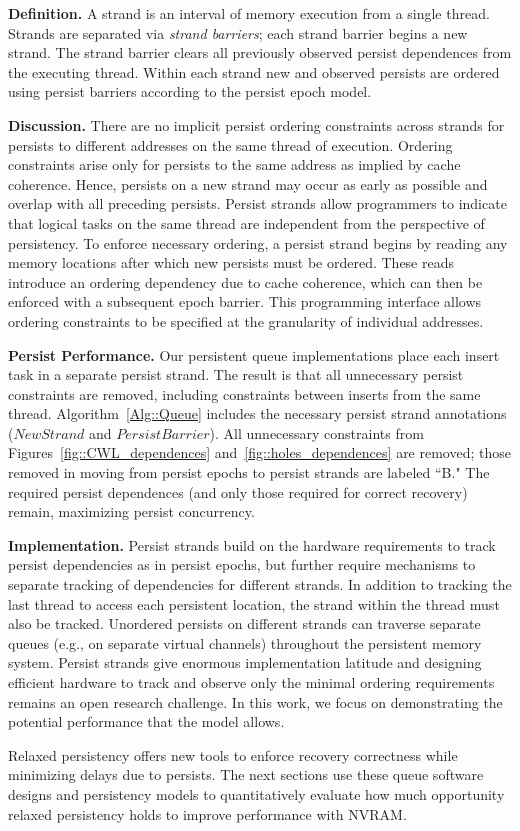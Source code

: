\textbf{Definition.}
A strand is an interval of memory execution from a single thread.
Strands are separated via \emph{strand barriers}; each strand barrier begins a new strand.
The strand barrier clears all previously observed persist dependences from the executing thread.
Within each strand new and observed persists are ordered using persist barriers according to the persist epoch model.

\textbf{Discussion.}
There are no implicit persist ordering constraints across strands for persists to different addresses on the same thread of execution.
Ordering constraints arise only for persists to the same address as implied by cache coherence.
Hence, persists on a new strand may occur as early as possible and overlap with all preceding persists.
Persist strands allow programmers to indicate that logical tasks on the same thread are independent from the perspective of persistency.
To enforce necessary ordering, a persist strand begins by reading any memory locations after which new persists must be ordered.
These reads introduce an ordering dependency due to cache coherence, which can then be enforced with a subsequent epoch barrier.
This programming interface allows ordering constraints to be specified at the granularity of individual addresses.

\textbf{Persist Performance.}
Our persistent queue implementations place each insert task in a separate persist strand.
The result is that all unnecessary persist constraints are removed, including constraints between inserts from the same thread.
Algorithm~\ref{Alg::Queue} includes the necessary persist strand annotations ($NewStrand$ and $PersistBarrier$).
All unnecessary constraints from Figures~\ref{fig::CWL_dependences} and~\ref{fig::holes_dependences} are removed; those removed in moving from persist epochs to persist strands are labeled ``B."
The required persist dependences (and only those required for correct recovery) remain, maximizing persist concurrency.

\textbf{Implementation.}
Persist strands build on the hardware requirements to track persist dependencies as in persist epochs, but further require mechanisms to separate tracking of dependencies for different strands.  In addition to tracking the last thread to access each persistent location, the strand within the thread must also be tracked.  Unordered persists on different strands can traverse separate queues (e.g., on separate virtual channels) throughout the persistent memory system.  Persist strands give enormous implementation latitude and designing efficient hardware to track and observe only the minimal ordering requirements remains an open research challenge.  In this work, we focus on demonstrating the potential performance that the model allows. 

Relaxed persistency offers new tools to enforce recovery correctness while minimizing delays due to persists.
The next sections use these queue software designs and persistency models to quantitatively evaluate how much opportunity relaxed persistency holds to improve performance with NVRAM.
